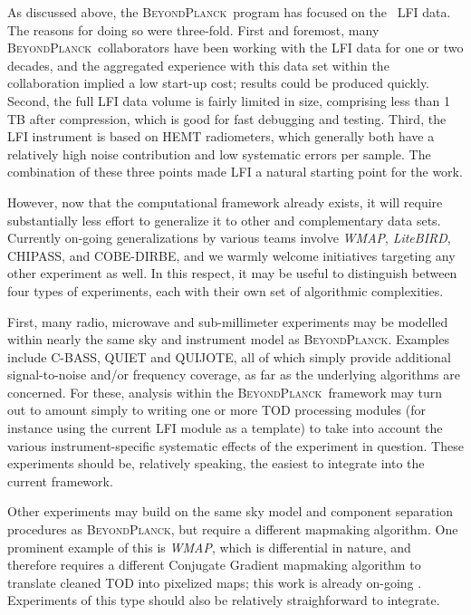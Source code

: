 \documentclass[twocolumn]{aa}
\def\WMAP{\emph{WMAP}}
\newcommand{\BP}{\textsc{BeyondPlanck}}
\begin{document}
As discussed above, the \BP\ program has focused on the \Planck\ LFI
data. The reasons for doing so were three-fold. First and foremost,
many \BP\ collaborators have been working with the LFI data for one or
two decades, and the aggregated experience with this data set within
the collaboration implied a low start-up cost; results could be
produced quickly. Second, the full LFI data volume is fairly limited
in size, comprising less than 1\,TB after compression, which is good
for fast debugging and testing. Third, the LFI instrument is based on
HEMT radiometers, which generally both have a relatively high noise
contribution and low systematic errors per sample. The combination of
these three points made LFI a natural starting point for the work.

However, now that the computational framework already exists, it will
require substantially less effort to generalize it to other and
complementary data sets. Currently on-going generalizations by various
teams involve \WMAP, \emph{LiteBIRD}, CHIPASS, and COBE-DIRBE, and we
warmly welcome initiatives targeting any other experiment as well. In
this respect, it may be useful to distinguish between four types of
experiments, each with their own set of algorithmic complexities.

First, many radio, microwave and sub-millimeter experiments may be
modelled within nearly the same sky and instrument model as
\BP. Examples include C-BASS, QUIET and QUIJOTE, all of which simply
provide additional signal-to-noise and/or frequency coverage, as far
as the underlying algorithms are concerned. For these, analysis within
the \BP\ framework may turn out to amount simply to writing one or
more TOD processing modules (for instance using the current LFI module
as a template) to take into account the various instrument-specific
systematic effects of the experiment in question. These experiments
should be, relatively speaking, the easiest to integrate into the
current framework.

Other experiments may build on the same sky model and component
separation procedures as \BP, but require a different mapmaking
algorithm. One prominent example of this is \WMAP, which is
differential in nature, and therefore requires a different Conjugate
Gradient mapmaking algorithm to translate cleaned TOD into pixelized
maps; this work is already on-going \citep{bp17}. Experiments of this type should
also be relatively straighforward to integrate.
\end{document}
